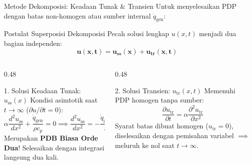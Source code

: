 \documentclass[aspectratio=169,10pt]{beamer}
\begin{document}
\begin{frame}{Metode Dekomposisi: Keadaan Tunak \& Transien}
  Untuk menyelesaikan PDP dengan batas non-homogen atau sumber internal $\dot{q}_{\text{gen}}$:
  \begin{block}{Postulat Superposisi Dekomposisi}
    \small
    Pecah solusi lengkap $u(x, t)$ menjadi dua bagian independen:
    \begin{equation*}
      \mathbf{u(x, t) = u_{\text{ss}}(x) + u_{\text{tr}}(x, t)}
    \end{equation*}
  \end{block}
  \begin{columns}[t]
    \begin{column}{0.48\textwidth}
      \begin{alertblock}{1. Solusi Keadaan Tunak: $u_{\text{ss}}(x)$}
        \small
        Kondisi asimtotik saat $t \to \infty$ ($\partial u/\partial t = 0$):
        \begin{equation*}
          \alpha \frac{d^2 u_{\text{ss}}}{dx^2} + \frac{\dot{q}_{\text{gen}}}{\rho c_p} = 0 \implies \frac{d^2 u_{\text{ss}}}{dx^2} = -\frac{\dot{q}_{\text{gen}}}{k}
        \end{equation*}
        Merupakan \textbf{PDB Biasa Orde Dua}! Selesaikan dengan integrasi langsung dua kali.
      \end{alertblock}
    \end{column}
    \begin{column}{0.48\textwidth}
      \begin{exampleblock}{2. Solusi Transien: $u_{\text{tr}}(x, t)$}
        \small
        Memenuhi PDP homogen tanpa sumber:
        \begin{equation*}
          \frac{\partial u_{\text{tr}}}{\partial t} = \alpha \frac{\partial^2 u_{\text{tr}}}{\partial x^2}
        \end{equation*}
        Syarat batas dibuat homogen ($u_{\text{tr}} = 0$), diselesaikan dengan pemisahan variabel $\implies$ meluruh ke nol saat $t \to \infty$.
      \end{exampleblock}
    \end{column}
  \end{columns}
\end{frame}
\end{document}
